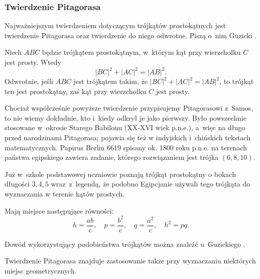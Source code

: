 %

\subsubsection{Twierdzenie Pitagorasa}
Najważniejszym twierdzeniem dotyczącym trójkątów prostokątnych jest twierdzenie Pitagorasa oraz twierdzenie do niego odwrotne.
Piszą o~nim Guzicki \cite[s. 160]{guzicki_2021}.

\begin{theorem}[Pitagorasa, ok. 500 r. p.n.e.]
%
    Niech $ABC$ będzie trójkątem prostokątnym, w~którym kąt przy wierzchołku $C$ jest prosty.
    Wtedy
    \begin{equation}
        |BC|^2 + |AC|^2 = |AB|^2.
    \end{equation}
    Odwrotnie, jeśli $ABC$ jest trójkątem takim, że $|BC|^2 + |AC|^2 = |AB|^2$, to trójkąt ten jest prostokątny, zaś kąt przy wierzchołku $C$ jest prosty.
\end{theorem}

Chociaż współcześnie powyższe twierdzenie przypisujemy Pitagorasowi z~Samos, to nie wiemy dokładnie, kto i~kiedy odkrył je jako pierwszy.
%
Było powszechnie stosowane w~okresie Starego Babilonu (XX-XVI wiek p.n.e.), a~więc na długo przed narodzinami Pitagorasa; pojawia się też w indyjskich i~chińskich tekstach matematycznych.
Papirus Berlin 6619 spisany ok. 1800 roku p.n.e. na terenach państwa egipskiego zawiera zadanie, którego rozwiązaniem jest trójka $(6, 8, 10)$.

Już w~szkole podstawowej uczniowie poznają trójkąt prostokątny o bokach długości $3, 4, 5$ wraz~z~legendą, że podobno Egipcjanie używali tego trójkąta do wyznaczania w terenie kątów prostych.


\begin{proposition}
    Mają miejsce następujące równości:
    \begin{equation}
        h = \frac{ab}{c}, \quad
        p = \frac{b^2}{c}, \quad
        q = \frac{a^2}{c}, \quad
        h^2 = pq.
    \end{equation}
\end{proposition}

Dowód wykorzystujący podobieństwa trójkątów można znaleźć u~Guzickiego \cite[s. 160, 161]{guzicki_2021}.

Twierdzenie Pitagorasa znajduje zastosowanie także przy wyznaczaniu niektórych miejsc geometrycznych.


